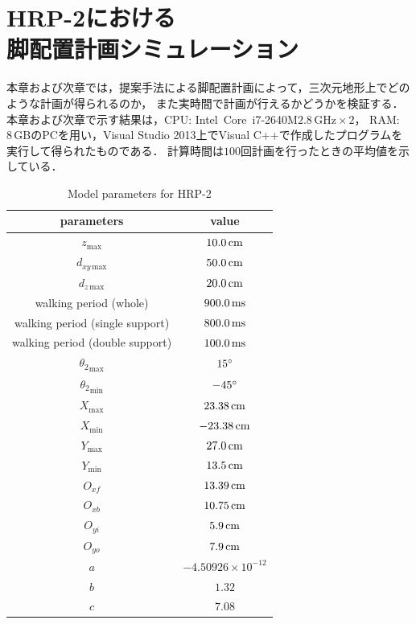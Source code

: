 \documentclass[autodetect-engine,dvipdfmx-if-dvi,ja=standard,a4j,jbase=11pt,magstyle=nomag*]{bxjsreport}
\begin{document}
\chapter[HRP-2における脚配置計画シミュレーション]{HRP-2における\\脚配置計画シミュレーション}
\label{chap:sim_hrp2}

本章および次章では，提案手法による脚配置計画によって，三次元地形上でどのような計画が得られるのか，
また実時間で計画が行えるかどうかを検証する．
本章および次章で示す結果は，CPU: Intel\textregistered\ Core\texttrademark\ i7-2640M$2.8\,\mathrm{GHz} \times 2$，
RAM:$8\,\mathrm{GB}$のPCを用い，Visual Studio 2013上でVisual C++で作成したプログラムを実行して得られたものである．
計算時間は$100$回計画を行ったときの平均値を示している．

\begin{table}[pt]
    \renewcommand{\arraystretch}{0.9}
    \centering
    \caption{Model parameters for HRP-2}
    \label{tab:sim_hrp2_param_model}
    \begin{tabular}{cc}
        \toprule%
        parameters                      &   value \\
        \midrule%
        $z_{\mathrm{max}}$              &   $10.0\,\si{\centi\meter}$ \\
        $d_{xy\,\mathrm{max}}$          &   $50.0\,\si{\centi\meter}$ \\
        $d_{z\,\mathrm{max}}$           &   $20.0\,\si{\centi\meter}$ \\
        walking period (whole)          &   $900.0\,\si{\milli\second}$ \\
        walking period (single support) &   $800.0\,\si{\milli\second}$ \\
        walking period (double support) &   $100.0\,\si{\milli\second}$ \\
        \midrule%
        ${\theta_2}_{\mathrm{max}}$     &   $15 \degree$ \\
        ${\theta_2}_{\mathrm{min}}$     &   $-45 \degree$ \\
        $X_{\mathrm{max}}$              &   $23.38\,\si{\centi\meter}$ \\
        $X_{\mathrm{min}}$              &   $-23.38\,\si{\centi\meter}$ \\
        $Y_{\mathrm{max}}$              &   $27.0\,\si{\centi\meter}$ \\
        $Y_{\mathrm{min}}$              &   $13.5\,\si{\centi\meter}$ \\
        $O_{xf}$                        &   $13.39\,\si{\centi\meter}$ \\
        $O_{xb}$                        &   $10.75\,\si{\centi\meter}$ \\
        $O_{yi}$                        &   $5.9\,\si{\centi\meter}$ \\
        $O_{yo}$                        &   $7.9\,\si{\centi\meter}$ \\
        $a$                             &   $-4.50926\times10^{-12}$ \\
        $b$                             &   $1.32$ \\
        $c$                             &   $7.08$ \\
        \bottomrule
    \end{tabular}
    \renewcommand{\arraystretch}{1.0}
\end{table}
\end{document}
